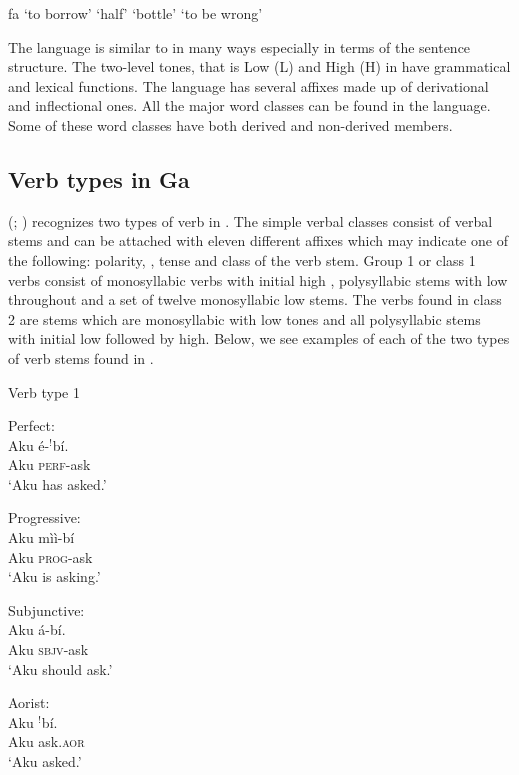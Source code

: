 \documentclass[output=paper,newtxmath,modfonts,nonflat,draftmode]{langsci/langscibook}
\begin{document}
\ea \label{ex:ollennu:1} 
\ea fa  `to borrow'  
  `half' 
   `bottle' 
   `to be wrong'
\z
\z

The language is similar to  in many ways especially in terms of the sentence structure. The two-level tones, that is Low (L) and High (H) in  have grammatical and lexical functions. The language has several affixes made up of derivational and inflectional ones. All the major word classes can be found in the language. Some of these word classes have both derived and non-derived members.

\subsection{\label{sec:ollennu:1.2} Verb types in Ga}

\citeauthor{Dakubu1970}  (\citeyear{Dakubu1970}; \citeyear{Dakubu2003}) recognizes two types of verb in . The simple verbal classes consist of verbal stems and can be attached with eleven different affixes which may indicate one of the following: polarity, , tense and class of the verb stem. Group 1 or class 1 verbs consist of monosyllabic verbs with initial high , polysyllabic stems with low  throughout and a set of twelve monosyllabic low  stems. The verbs found in class 2 are stems which are monosyllabic with low tones and all polysyllabic stems with initial low  followed by high. Below, we see examples of each of the two types of verb stems found in .


Verb type 1



\ea \label{ex:ollennu:2} Perfect:\\
\ea
\gll Aku é-$^{!}$bí. \\
	Aku \textsc{perf}-ask \\
\glt `Aku has asked.'

\ex Progressive:\\
\gll Aku mìì-bí\\
Aku \textsc{prog}-ask\\
\glt `Aku is asking.'

\ex Subjunctive:\\
\gll Aku á-bí.\\
Aku \textsc{sbjv}-ask\\
\glt `Aku should ask.'
\z 
\z

\ea Aorist:\\
\ea
\gll Aku $^{!}$bí.\\
Aku ask.\textsc{aor}\\
\glt `Aku asked.'
\end{document}
